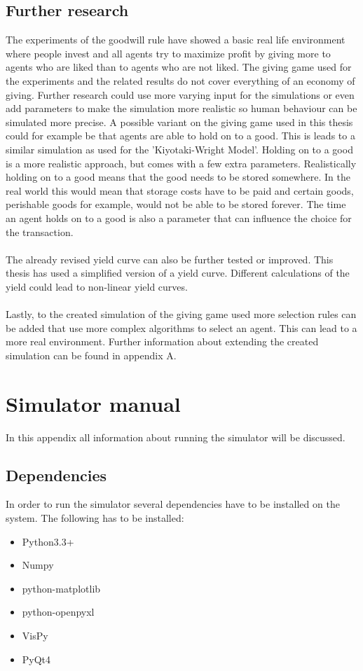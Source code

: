 \documentclass[twoside,openright]{uva-bachelor-thesis}
\begin{document}
\section{Further research}
The experiments of the goodwill rule have showed a basic real life environment where people invest and all agents try to maximize profit by giving more to agents who are liked than to agents who are not liked. The giving game used for the experiments and the related results do not cover everything of an economy of giving. Further research could use more varying input for the simulations or even add parameters to make the simulation more realistic so human behaviour can be simulated more precise. A possible variant on the giving game used in this thesis could for example be that agents are able to hold on to a good. This is leads to a similar simulation as used for the 'Kiyotaki-Wright Model'\cite{moranmoney}. Holding on to a good is a more realistic approach, but comes with a few extra parameters. Realistically holding on to a good means that the good needs to be stored somewhere. In the real world this would mean that storage costs have to be paid and certain goods, perishable goods for example, would not be able to be stored forever. The time an agent holds on to a good is also a parameter that can influence the choice for the transaction.
\\
\\
The already revised yield curve can also be further tested or improved. This thesis has used a simplified version of a yield curve. Different calculations of the yield could lead to non-linear yield curves. \\
\\
Lastly, to the created simulation of the giving game used more selection rules can be added that use more complex algorithms to select an agent. This can lead to a more real environment. Further information about extending the created simulation can be found in appendix A.





\appendix
\chapter{Simulator manual}
In this appendix all information about running the simulator will be discussed.

\section{Dependencies}
In order to run the simulator several dependencies have to be installed on the system. The following has to be installed:
\begin{itemize}
\item Python3.3+
\item Numpy
\item python-matplotlib
\item python-openpyxl
\item VisPy
\item PyQt4
\end{itemize}
\end{document}
